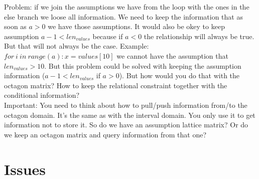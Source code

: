 \documentclass[11pt]{article}
\begin{document}
Problem: if we join the assumptions we have from the loop with the ones in the else branch we loose all information. We need to keep the information that as soon as $a > 0$ we have those assumptions. It would also be okey to keep assumption $a-1 < len_{values}$ because if $a < 0$ the relationship will always be true. But that will not always be the case. Example: $for\:i\:in\:range(a): x = values[10]$ we cannot have the assumption that $len_{values} > 10$. But this problem could be solved with keeping the assumption information ($a-1 < len_{values}$ if $a > 0$). But how would you do that with the octagon matrix? How to keep the relational constraint together with the conditional information?\\
Important: You need to think about how to pull/push information from/to the octagon domain. It's the same as with the interval domain. You only use it to get information not to store it. So do we have an assumption lattice matrix? Or do we keep an octagon matrix and query information from that one?

\section{Issues}
\end{document}
